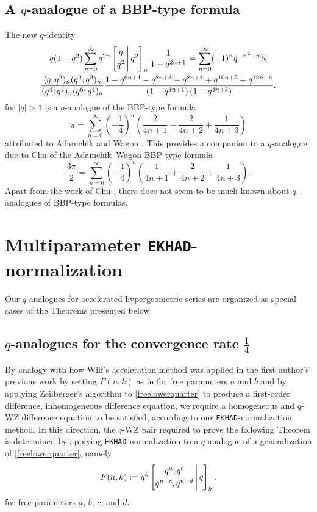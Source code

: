\documentclass[12pt]{article}
\begin{document}
 \subsection{A $q$-analogue of a BBP-type formula}
 The new $q$-identity 
\begin{multline*}
 q(1 - q^2) 
 \sum_{n=0}^{\infty} q^{2n}
 \left[ \begin{matrix} 
 q \vspace{1mm} \\ 
 q^2 \end{matrix} \, \Bigg| \, q^2 \right]_{n} 
 \frac{1}{1-q^{2n+1}} = \sum_{n=0}^{\infty} (-1)^{n} 
 q^{-n^2-n} \times \\ 
 \frac{ (q;q^2)_{n} (q^2;q^2)_{n} }{(q^4;q^4)_{n} (q^6;q^4)_{n} } 
 \frac{1 - q^{6 n+4}-q^{8 n+3}-q^{8 n+4}+q^{10 n+5}+q^{12 n+6}}{\left(1-q^{4 n+1}\right) \left(1-q^{4 n+3}\right)}. 
\end{multline*}
 for $|q| > 1$ is a $q$-analogue of the BBP-type formula $$ \pi = \sum_{n=0}^{\infty} \left( -\frac{1}{4} \right)^{n} \left( \frac{2}{4n+1} + 
 \frac{2}{4n+2} + \frac{1}{4n+3} \right) $$ attributed to Adamchik and Wagon \cite{AdamchikWagon1996}. This provides a 
 companion to a $q$-analogue due to Chu \cite{Chu2018} of the Adamchik--Wagon BBP-type formula $$ \frac{3\pi}{2} = \sum_{n = 
 0}^{\infty} \left( -\frac{1}{4} \right)^{n} \left( \frac{1}{4n+1} + \frac{2}{4n+2} + \frac{1}{4n+3} \right). $$ Apart from the work of Chu 
 \cite{Chu2018}, there does not seem to be much known about $q$-analogues of BBP-type formulas. 

\section{Multiparameter {\tt EKHAD}-normalization}
 Our $q$-analogues for accelerated hypergeometric series are organized as special cases of the Theorems presented below. 

\subsection{$q$-analogues for the convergence rate $\frac{1}{4}$}\label{subquarter}
 By analogy with how Wilf's acceleration method \cite{Wilf1999} was applied in the first author's previous work by setting $F(n, k)$ as in 
 for free parameters $a$ and $b$ and by applying Zeilberger's algorithm to \eqref{freelowerquarter} to produce a first-order difference, 
 inhomogeneous difference equation, we require a homogeneous and $q$-WZ difference equation to be satisfied, according to our
 {\tt EKHAD}-normalization method. In this direction, the $q$-WZ pair required to prove the following Theorem is determined by 
 applying {\tt EKHAD}-normalization to a $q$-analogue of a generalization of \eqref{freelowerquarter}, namely 
\begin{equation}\label{prototypeqF}
 F(n, k) := q^{k} \left[ \begin{matrix} 
 q^{a}, q^{b} \vspace{1mm} \\ 
 q^{n+c}, q^{n+d} \end{matrix} \, \Bigg| \, q \right]_{k}, 
\end{equation}
 for free parameters $a$, $b$, $c$, and $d$. 
\end{document}
